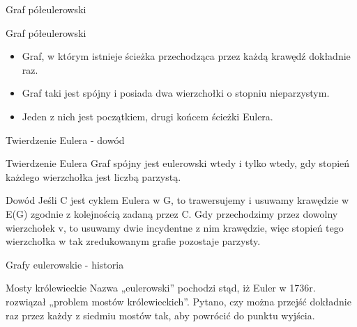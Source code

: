 \documentclass[polish,envcountsect,10pt]{beamer}
\begin{document}
\begin{frame}{Graf półeulerowski}
    \begin{block}{Graf półeulerowski}
        \begin{itemize}
            \item Graf, w którym istnieje ścieżka przechodząca przez każdą krawędź dokładnie raz.
            \item Graf taki jest spójny i posiada dwa wierzchołki o stopniu nieparzystym.
            \item Jeden z nich jest początkiem, drugi końcem ścieżki Eulera.
        \end{itemize}
    \end{block}
    \begin{center}
    \end{center}
\end{frame}

\begin{frame}{Twierdzenie Eulera - dowód}
\begin{block}{Twierdzenie Eulera}
    Graf spójny jest eulerowski wtedy i tylko wtedy, gdy
    stopień każdego wierzchołka jest liczbą parzystą.
\end{block}
\begin{block}{Dowód}
    Jeśli C jest cyklem Eulera w G, to trawersujemy i usuwamy
    krawędzie w E(G) zgodnie z kolejnością zadaną przez C. Gdy przechodzimy
    przez dowolny wierzchołek v, to usuwamy dwie incydentne z nim krawędzie,
    więc stopień tego wierzchołka w tak zredukowanym grafie pozostaje
    parzysty.
\end{block}
\end{frame}

\begin{frame}{Grafy eulerowskie - historia}
    \begin{block}{Mosty królewieckie}
        Nazwa „eulerowski” pochodzi stąd, iż Euler w 1736r. rozwiązał „problem
        mostów królewieckich”. Pytano, czy można przejść dokładnie raz przez
        każdy z siedmiu mostów tak, aby powrócić do punktu wyjścia.
    \end{block}
\end{frame}
\end{document}
